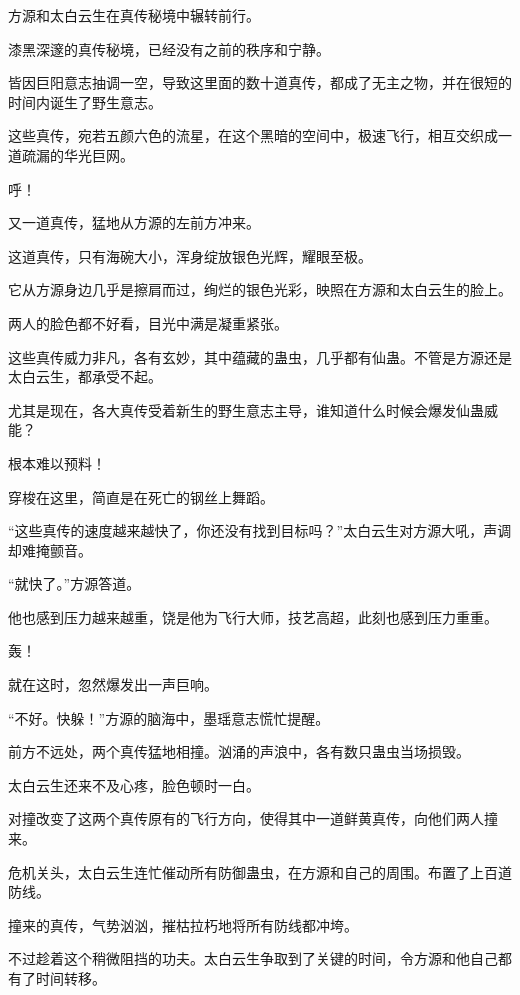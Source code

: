 
\begin{this_body}



方源和太白云生在真传秘境中辗转前行。

漆黑深邃的真传秘境，已经没有之前的秩序和宁静。

皆因巨阳意志抽调一空，导致这里面的数十道真传，都成了无主之物，并在很短的时间内诞生了野生意志。

这些真传，宛若五颜六色的流星，在这个黑暗的空间中，极速飞行，相互交织成一道疏漏的华光巨网。

呼！

又一道真传，猛地从方源的左前方冲来。

这道真传，只有海碗大小，浑身绽放银色光辉，耀眼至极。

它从方源身边几乎是擦肩而过，绚烂的银色光彩，映照在方源和太白云生的脸上。

两人的脸色都不好看，目光中满是凝重紧张。

这些真传威力非凡，各有玄妙，其中蕴藏的蛊虫，几乎都有仙蛊。不管是方源还是太白云生，都承受不起。

尤其是现在，各大真传受着新生的野生意志主导，谁知道什么时候会爆发仙蛊威能？

根本难以预料！

穿梭在这里，简直是在死亡的钢丝上舞蹈。

“这些真传的速度越来越快了，你还没有找到目标吗？”太白云生对方源大吼，声调却难掩颤音。

“就快了。”方源答道。

他也感到压力越来越重，饶是他为飞行大师，技艺高超，此刻也感到压力重重。

轰！

就在这时，忽然爆发出一声巨响。

“不好。快躲！”方源的脑海中，墨瑶意志慌忙提醒。

前方不远处，两个真传猛地相撞。汹涌的声浪中，各有数只蛊虫当场损毁。

太白云生还来不及心疼，脸色顿时一白。

对撞改变了这两个真传原有的飞行方向，使得其中一道鲜黄真传，向他们两人撞来。

危机关头，太白云生连忙催动所有防御蛊虫，在方源和自己的周围。布置了上百道防线。

撞来的真传，气势汹汹，摧枯拉朽地将所有防线都冲垮。

不过趁着这个稍微阻挡的功夫。太白云生争取到了关键的时间，令方源和他自己都有了时间转移。


\end{this_body}
